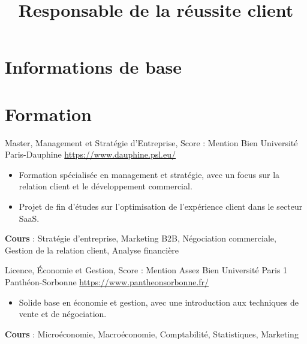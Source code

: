 \documentclass[a4paper, serif, 10pt]{moderncv}
\title{Responsable de la réussite client}
\begin{document}
\maketitle

\section{Informations de base}

\section{Formation}

        {Master, Management et Stratégie d'Entreprise, Score : Mention Bien}
        {Université Paris-Dauphine}
        {\url{https://www.dauphine.psl.eu/}}
        {}
        {\begin{itemize}
\item Formation spécialisée en management et stratégie, avec un focus sur la relation client et le développement commercial.
\item Projet de fin d'études sur l'optimisation de l'expérience client dans le secteur SaaS.
\end{itemize}
\textbf{Cours} : Stratégie d'entreprise, Marketing B2B, Négociation commerciale, Gestion de la relation client, Analyse financière}

        {Licence, Économie et Gestion, Score : Mention Assez Bien}
        {Université Paris 1 Panthéon-Sorbonne}
        {\url{https://www.pantheonsorbonne.fr/}}
        {}
        {\begin{itemize}
\item Solide base en économie et gestion, avec une introduction aux techniques de vente et de négociation.
\end{itemize}
\textbf{Cours} : Microéconomie, Macroéconomie, Comptabilité, Statistiques, Marketing}
\end{document}
